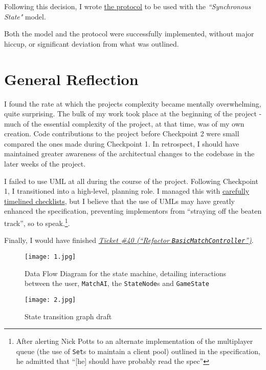 \documentclass[11pt,a4paper]{report}
\begin{document}
Following this decision, I wrote \href{https://github.com/UQdeco2800/deco2800-2016-pyramidscheme/wiki/Multiplayer}{the protocol} to be used with the \textit{``Synchronous State"} model.

Both the model and the protocol were successfully implemented, without major hiccup, or significant deviation from what was outlined.

\section{General Reflection}

I found the rate at which the projects complexity became mentally overwhelming, quite surprising. The bulk of my work took place at the beginning of the project - much of the essential complexity of the project, at that time, was of my own creation. Code contributions to the project before Checkpoint 2 were small compared the ones made during Checkpoint 1. In retrospect, I should have maintained greater awareness of the architectual changes to the codebase in the later weeks of the project.

I failed to use UML at all during the course of the project. Following Checkpoint 1, I transitioned into a high-level, planning role. I managed this with \href{https://github.com/UQdeco2800/deco2800-2016-pyramidscheme/issues/79}{carefully timelined checklists}, but I believe that the use of UMLs may have greatly enhanced the specification, preventing implementors from ``straying off the beaten track'', so to speak.\footnote{After alerting Nick Potts to an alternate implementation of the multiplayer queue (the use of \texttt{Set}s to maintain a client pool) outlined in the specification, he admitted that ``[he] should have probably read the spec''}.

Finally, I would have finished \href{https://github.com/UQdeco2800/deco2800-2016-pyramidscheme/issues/40}{\textit{Ticket \#40 (``Refactor \texttt{BasicMatchController}'')}}.

 \begin{figure}[p]
    \label{DFD}
    \caption{Data Flow Diagram for the state machine, detailing interactions between the user, \texttt{MatchAI}, the \texttt{StateNode}s and \texttt{GameState}}
    \centering
    \texttt{[image: 1.jpg]}
\end{figure}
 \begin{figure}[p]
    \label{StateTransitionGraph}
    \caption{State transition graph draft}
    \centering
    \texttt{[image: 2.jpg]}
\end{figure}
\end{document}
